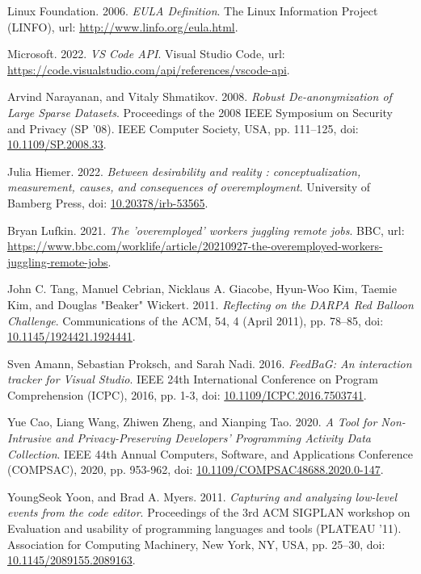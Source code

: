\begin{thebibliography}{99}
 Linux Foundation. 2006. \textit{EULA Definition}. The Linux Information Project (LINFO), url: \url{http://www.linfo.org/eula.html}.

 Microsoft. 2022. \textit{VS Code API}. Visual Studio Code, url: \url{https://code.visualstudio.com/api/references/vscode-api}.

 Arvind Narayanan, and Vitaly Shmatikov. 2008. \textit{Robust De-anonymization of Large Sparse Datasets}. Proceedings of the 2008 IEEE Symposium on Security and Privacy (SP '08). IEEE Computer Society, USA, pp. 111–125, doi: \href{https://doi.org/10.1109/SP.2008.33}{10.1109/SP.2008.33}.

 Julia Hiemer. 2022. \textit{Between desirability and reality : conceptualization, measurement, causes, and consequences of overemployment}. University of Bamberg Press, doi: \href{https://doi.org/10.20378/irb-53565}{10.20378/irb-53565}.

 Bryan Lufkin. 2021. \textit{The 'overemployed' workers juggling remote jobs}. BBC, url: \url{https://www.bbc.com/worklife/article/20210927-the-overemployed-workers-juggling-remote-jobs}.

 John C. Tang, Manuel Cebrian, Nicklaus A. Giacobe, Hyun-Woo Kim, Taemie Kim, and Douglas "Beaker" Wickert. 2011. \textit{Reflecting on the DARPA Red Balloon Challenge}. Communications of the ACM, 54, 4 (April 2011), pp. 78–85, doi: \href{https://doi.org/10.1145/1924421.1924441}{10.1145/1924421.1924441}.

 Sven Amann, Sebastian Proksch, and Sarah Nadi. 2016. \textit{FeedBaG: An interaction tracker for Visual Studio}. IEEE 24th International Conference on Program Comprehension (ICPC), 2016, pp. 1-3, doi: \href{https://doi.org/10.1109/ICPC.2016.7503741}{10.1109/ICPC.2016.7503741}.

 Yue Cao, Liang Wang, Zhiwen Zheng, and Xianping Tao. 2020. \textit{A Tool for Non-Intrusive and Privacy-Preserving Developers' Programming Activity Data Collection}. IEEE 44th Annual Computers, Software, and Applications Conference (COMPSAC), 2020, pp. 953-962, doi: \href{https://doi.org/10.1109/COMPSAC48688.2020.0-147}{10.1109/COMPSAC48688.2020.0-147}.

 YoungSeok Yoon, and Brad A. Myers. 2011. \textit{Capturing and analyzing low-level events from the code editor}. Proceedings of the 3rd ACM SIGPLAN workshop on Evaluation and usability of programming languages and tools (PLATEAU '11). Association for Computing Machinery, New York, NY, USA, pp. 25–30, doi: \href{https://doi.org/10.1145/2089155.2089163}{10.1145/2089155.2089163}.


\end{thebibliography}
